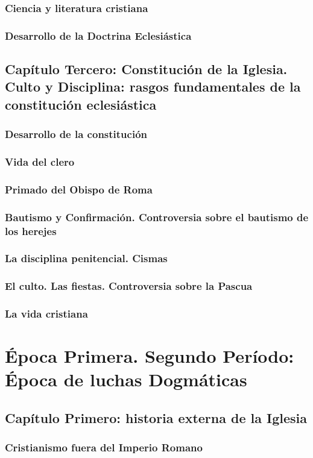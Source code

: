 \raggedbottom{} \documentclass[12pt, a4paper, openany]{book} %
\begin{document}
\section{Ciencia y literatura cristiana}
\section{Desarrollo de la Doctrina Eclesiástica}
\chapter{Capítulo Tercero: Constitución de la Iglesia. Culto y Disciplina: rasgos fundamentales de la constitución eclesiástica}
\section{Desarrollo de la constitución}
\section{Vida del clero}
\section{Primado del Obispo de Roma}
\section{Bautismo y Confirmación. Controversia sobre el bautismo de los herejes}
\section{La disciplina penitencial. Cismas}
\section{El culto. Las fiestas. Controversia sobre la Pascua}
\section{La vida cristiana}
\part{Época Primera. Segundo Período: Época de luchas Dogmáticas}
\chapter{Capítulo Primero: historia externa de la Iglesia}
\section{Cristianismo fuera del Imperio Romano}
\end{document}
